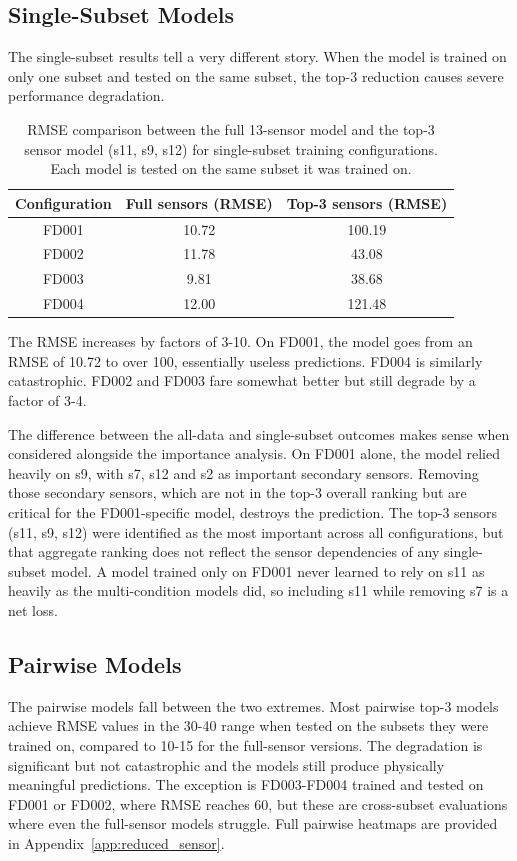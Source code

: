 \subsection{Single-Subset Models}
The single-subset results tell a very different story. When the model is trained on only one subset and tested on the same subset, the top-3 reduction causes severe performance degradation.
%
\begin{table}[ht]
    \centering
    \begin{tabular}{c c c}
        \toprule
        Configuration & Full sensors (RMSE) & Top-3 sensors (RMSE) \\
        \midrule
        FD001 & 10.72  & 100.19 \\
        FD002 & 11.78  & 43.08  \\
        FD003 &  9.81  & 38.68  \\
        FD004 & 12.00  & 121.48 \\
        \bottomrule
    \end{tabular}
    \caption{RMSE comparison between the full 13-sensor model and the top-3 sensor model (s11, s9, s12) for single-subset training configurations. Each model is tested on the same subset it was trained on.}
    \label{tab:rmse_single}
\end{table}
%
The RMSE increases by factors of 3-10. On FD001, the model goes from an RMSE of 10.72 to over 100, essentially useless predictions. FD004 is similarly catastrophic. FD002 and FD003 fare somewhat better but still degrade by a factor of 3-4. 

The difference between the all-data and single-subset outcomes makes sense when considered alongside the importance analysis. On FD001 alone, the model relied heavily on s9, with s7, s12 and s2 as important secondary sensors. Removing those secondary sensors, which are not in the top-3 overall ranking but are critical for the FD001-specific model, destroys the prediction. The top-3 sensors (s11, s9, s12) were identified as the most important across all configurations, but that aggregate ranking does not reflect the sensor dependencies of any single-subset model. A model trained only on FD001 never learned to rely on s11 as heavily as the multi-condition models did, so including s11 while removing s7 is a net loss.

\subsection{Pairwise Models}
The pairwise models fall between the two extremes. Most pairwise top-3 models achieve RMSE values in the 30-40 range when tested on the subsets they were trained on, compared to 10-15 for the full-sensor versions. The degradation is significant but not catastrophic and the models still produce physically meaningful predictions. The exception is FD003-FD004 trained and tested on FD001 or FD002, where RMSE reaches 60, but these are cross-subset evaluations where even the full-sensor models struggle. Full pairwise heatmaps are provided in Appendix~\ref{app:reduced_sensor}.

